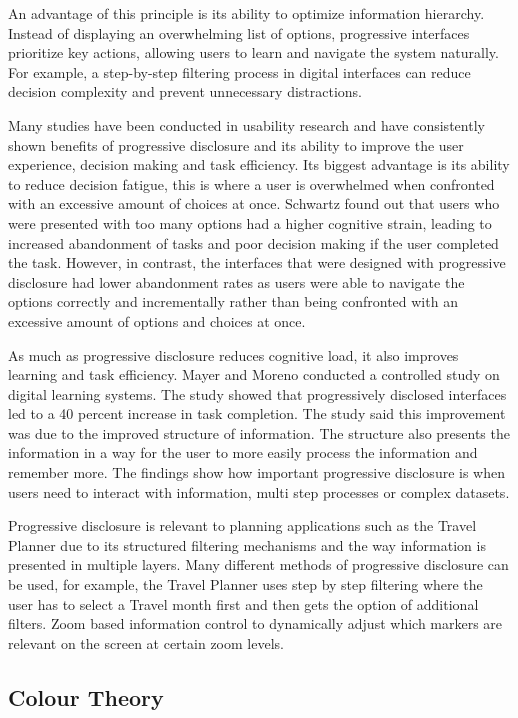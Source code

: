 \documentclass[]{project_final}
\begin{document}
An advantage of this principle is its ability to optimize information hierarchy. Instead of displaying an overwhelming list of options, progressive interfaces prioritize key actions, allowing users to learn and navigate the system naturally. For example, a step-by-step filtering process in digital interfaces can reduce decision complexity and prevent unnecessary distractions.

Many studies have been conducted in usability research and have consistently shown benefits of progressive disclosure and its ability to improve the user experience, decision making and task efficiency. Its biggest advantage is its ability to reduce decision fatigue, this is where a user is overwhelmed when confronted with an excessive amount of choices at once. Schwartz found out that users who were presented with too many options had a higher cognitive strain, leading to increased abandonment of tasks and poor decision making if the user completed the task. However, in contrast, the interfaces that were designed with progressive disclosure had lower abandonment rates as users were able to navigate the options correctly and incrementally rather than being confronted with an excessive amount of options and choices at once.

As much as progressive disclosure reduces cognitive load, it also improves learning and task efficiency. Mayer and Moreno conducted a controlled study on digital learning systems. The study showed that progressively disclosed interfaces led to a 40 percent increase in task completion. The study said this improvement was due to the improved structure of information. The structure also presents the information in a way for the user to more easily process the information and remember more. The findings show how important progressive disclosure is when users need to interact with information, multi step processes or complex datasets.

Progressive disclosure is relevant to planning applications such as the Travel Planner due to its structured filtering mechanisms and the way information is presented in multiple layers. Many different methods of progressive disclosure can be used, for example, the Travel Planner uses step by step filtering where the user has to select a Travel month first and then gets the option of additional filters. Zoom based information control to dynamically adjust which markers are relevant on the screen at certain zoom levels.

\subsection{Colour Theory}
\end{document}
